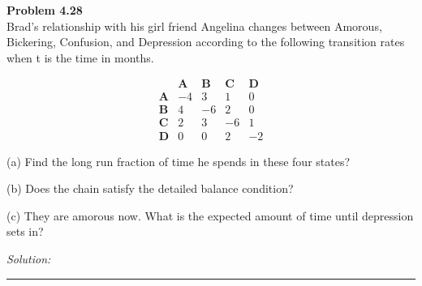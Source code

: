\documentclass[a4paper, 11pt]{article}
\newenvironment{problem}[2][Problem]
    { \begin{mdframed}[backgroundcolor=gray!20] \textbf{#1 #2} \\}
    {  \end{mdframed}}
\newenvironment{solution}
    {\textit{Solution:}}
    {}
\begin{document}
\begin{problem}{4.28}
Brad’s relationship with his girl friend Angelina changes between Amorous, Bickering, Confusion, and Depression according to the following transition rates when t is the time in months.

$$
\begin{array}{ccccc} 
& \mathbf{A} & \mathbf{B} & \mathbf{C} & \mathbf{D} \\
\mathbf{A} & -4 & 3 & 1 & 0 \\
\mathbf{B} & 4 & -6 & 2 & 0 \\
\mathbf{C} & 2 & 3 & -6 & 1 \\
\mathbf{D} & 0 & 0 & 2 & -2
\end{array}
$$

(a) Find the long run fraction of time he spends in these four states?

(b) Does the chain satisfy the detailed balance condition? 

(c) They are amorous now.  What is the expected amount of time until depression sets in?
\end{problem}
\begin{solution}

\end{solution} 
%
\noindent\rule{7in}{2.8pt}
\end{document}
